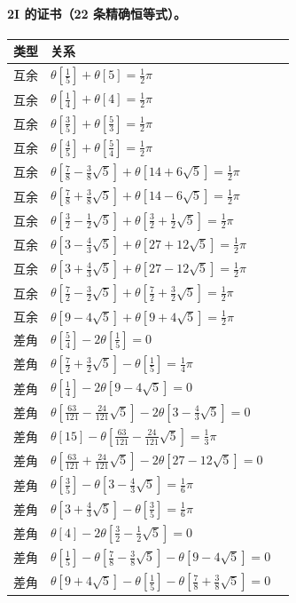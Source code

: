 \paragraph{2I 的证书（22 条精确恒等式）。}
{\small\begin{longtable}{@{}rll@{}}\toprule 类型 & 关系 & \\\midrule\endhead
互余 & $\theta[\tfrac{1}{5}]+\theta[5]=\tfrac{1}{2}\pi$ & \\
互余 & $\theta[\tfrac{1}{4}]+\theta[4]=\tfrac{1}{2}\pi$ & \\
互余 & $\theta[\tfrac{3}{5}]+\theta[\tfrac{5}{3}]=\tfrac{1}{2}\pi$ & \\
互余 & $\theta[\tfrac{4}{5}]+\theta[\tfrac{5}{4}]=\tfrac{1}{2}\pi$ & \\
互余 & $\theta[\tfrac{7}{8}-\tfrac{3}{8}\sqrt5]+\theta[14+6\sqrt5]=\tfrac{1}{2}\pi$ & \\
互余 & $\theta[\tfrac{7}{8}+\tfrac{3}{8}\sqrt5]+\theta[14-6\sqrt5]=\tfrac{1}{2}\pi$ & \\
互余 & $\theta[\tfrac{3}{2}-\tfrac{1}{2}\sqrt5]+\theta[\tfrac{3}{2}+\tfrac{1}{2}\sqrt5]=\tfrac{1}{2}\pi$ & \\
互余 & $\theta[3-\tfrac{4}{3}\sqrt5]+\theta[27+12\sqrt5]=\tfrac{1}{2}\pi$ & \\
互余 & $\theta[3+\tfrac{4}{3}\sqrt5]+\theta[27-12\sqrt5]=\tfrac{1}{2}\pi$ & \\
互余 & $\theta[\tfrac{7}{2}-\tfrac{3}{2}\sqrt5]+\theta[\tfrac{7}{2}+\tfrac{3}{2}\sqrt5]=\tfrac{1}{2}\pi$ & \\
互余 & $\theta[9-4\sqrt5]+\theta[9+4\sqrt5]=\tfrac{1}{2}\pi$ & \\
差角 & $\theta[\tfrac{5}{4}]-2\theta[\tfrac{1}{5}]=0$ & \\
差角 & $\theta[\tfrac{7}{2}+\tfrac{3}{2}\sqrt5]-\theta[\tfrac{1}{5}]=\tfrac{1}{4}\pi$ & \\
差角 & $\theta[\tfrac{1}{4}]-2\theta[9-4\sqrt5]=0$ & \\
差角 & $\theta[\tfrac{63}{121}-\tfrac{24}{121}\sqrt5]-2\theta[3-\tfrac{4}{3}\sqrt5]=0$ & \\
差角 & $\theta[15]-\theta[\tfrac{63}{121}-\tfrac{24}{121}\sqrt5]=\tfrac{1}{3}\pi$ & \\
差角 & $\theta[\tfrac{63}{121}+\tfrac{24}{121}\sqrt5]-2\theta[27-12\sqrt5]=0$ & \\
差角 & $\theta[\tfrac{3}{5}]-\theta[3-\tfrac{4}{3}\sqrt5]=\tfrac{1}{6}\pi$ & \\
差角 & $\theta[3+\tfrac{4}{3}\sqrt5]-\theta[\tfrac{3}{5}]=\tfrac{1}{6}\pi$ & \\
差角 & $\theta[4]-2\theta[\tfrac{3}{2}-\tfrac{1}{2}\sqrt5]=0$ & \\
差角 & $\theta[\tfrac{1}{5}]-\theta[\tfrac{7}{8}-\tfrac{3}{8}\sqrt5]-\theta[9-4\sqrt5]=0$ & \\
差角 & $\theta[9+4\sqrt5]-\theta[\tfrac{1}{5}]-\theta[\tfrac{7}{8}+\tfrac{3}{8}\sqrt5]=0$ & \\
\bottomrule\end{longtable}}
